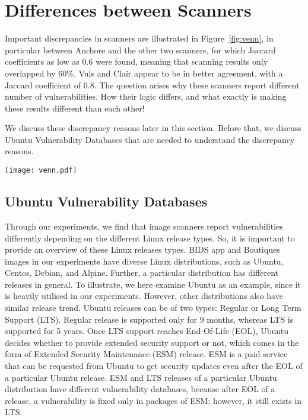 \section{Differences between Scanners}

Important
discrepancies in scanners are illustrated in Figure~\ref{fig:venn}, in
particular between Anchore and the other two scanners, for which Jaccard
coefficients as low as 0.6 were found, meaning that scanning results only
overlapped by 60\%. Vuls and Clair appear to be in better agreement, with a
Jaccard coefficient of 0.8.
The question arises why these scanners report different number of vulnerabilities.
How their logic differs, and what exactly is making these results different than each other!

We discuss these discrepancy reasons later in this section. Before that, we discuss
Ubuntu Vulnerability Databases that are needed to understand the discrepancy reasons.
\begin{center}
\texttt{[image: venn.pdf]}
\label{fig:venn}
\end{center}

\subsection{Ubuntu Vulnerability Databases}

Through our experiments, we find that image scanners report vulnerabilities
differently depending on the different Linux release types. So, it is
important to provide an overview of these Linux releases types.
BIDS app and Boutiques images in our experiments have diverse Linux
distributions, such as Ubuntu, Centos, Debian, and Alpine. Further, a particular
distribution has different releases in general. To illustrate, we here examine Ubuntu as an example,
since it is heavily utilised in our experiments. However, other distributions also have
similar release trend. Ubuntu releases
can be of two types: Regular or Long Term Support (LTS).
Regular release is supported only for 9 months, whereas LTS is supported for 5 years. Once LTS support
reaches End-Of-Life (EOL), Ubuntu decides whether to provide extended security support or not, which comes
in the form of Extended Security Maintenance (ESM) release.
ESM is a paid service that can be requested from Ubuntu to get security
updates even after the EOL of a particular Ubuntu release. ESM and LTS releases of a particular Ubuntu distribution have different vulnerability
databases, because after EOL of a release, a vulnerability is fixed only in packages of ESM; however, it still
exists in LTS.

